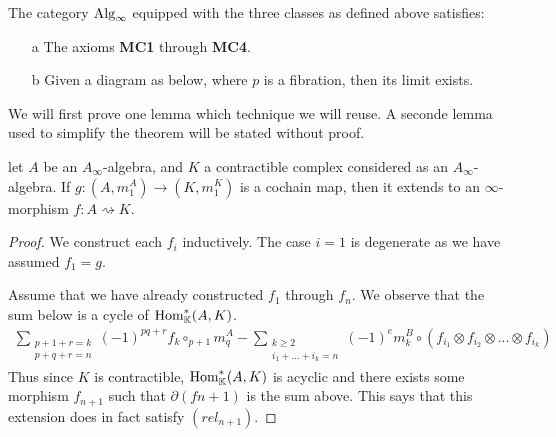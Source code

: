 \documentclass[../thesis.tex]{subfiles}
\begin{document}
        \begin{thm}\label{thm: model-A-inf}
            The category $\tt{Alg}_\infty$ equipped with the three classes as defined above satisfies:
            \begin{itemize} 
                \item[a] The axioms \textbf{MC1} through \textbf{MC4}.
                \item[b] Given a diagram as below, where $p$ is a fibration, then its limit exists.
                \begin{center}
                \end{center}
            \end{itemize}
        \end{thm}

        We will first prove one lemma which technique we will reuse. A seconde lemma used to simplify the theorem will be stated without proof.

        \begin{lemma}\label{lem: inf-creator}
            let $A$ be an $A_\infty$-algebra, and $K$ a contractible complex considered as an $A_\infty$-algebra. If $g: (A,m_1^A) \rightarrow (K, m_1^K)$ is a cochain map, then it extends to an $\infty$-morphism $f: A \rightsquigarrow K$.
        \end{lemma}

        \begin{proof}
            We construct each $f_i$ inductively. The case $i=1$ is degenerate as we have assumed $f_1 = g$.

            Assume that we have already constructed $f_1$ through $f_n$. We observe that the sum below is a cycle of $\tt{Hom}^*_\mathbb{K}(A,K)$.
            \begin{align*}
                \sum_{\substack{p + 1 + r = k \\ p + q + r = n}}(-1)^{pq+r}f_k\circ_{p+1}m^A_q - \sum_{\substack{k\geq 2 \\ i_1 + ... + i_k = n}}(-1)^{e}m^B_k \circ (f_{i_1}\otimes f_{i_2}\otimes ... \otimes f_{i_k})
            \end{align*}
            Thus since $K$ is contractible, $\tt{Hom}^*_\mathbb{K}(A,K)$ is acyclic and there exists some morphism $f_{n+1}$ such that $\partial (f{n+1})$ is the sum above. This says that this extension does in fact satisfy $(rel_{n+1})$.
        \end{proof}
\end{document}
